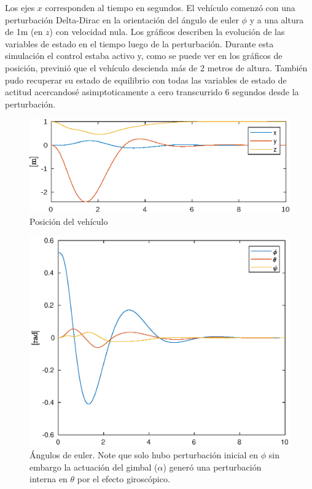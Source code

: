 Los ejes $x$ corresponden al tiempo en segundos. El vehículo comenzó con una perturbación Delta-Dirac en la orientación del ángulo de euler $\phi$ y a una altura de 1m (en $z$) con velocidad nula. Los gráficos describen la evolución de las variables de estado en el tiempo luego de la perturbación. Durante esta simulación el control estaba activo y, como se puede ver en los gráficos de posición, previnió que el vehículo descienda más de 2 metros de altura. También pudo recuperar su estado de equilibrio con todas las variables de estado de actitud acercandosé asimptoticamente a cero transcurrido 6 segundos desde la perturbación.

\begin{figure}[!ht]
    \centering
    \includegraphics[width=1.4\linewidth, angle=90]{fig/pos_edf}
    \caption{Posición del vehículo}
    \label{fig:pos_edf}
\end{figure}

\begin{figure}[!ht]
    \centering
    \includegraphics[width=1\linewidth]{fig/eulerang_edf}
    \caption{Ángulos de euler. Note que solo hubo perturbación inicial en $\phi$ sin embargo la actuación del gimbal ($\alpha$) generó una perturbación interna en $\theta$ por el efecto giroscópico.}
    \label{fig:eulerang_edf}
\end{figure}

